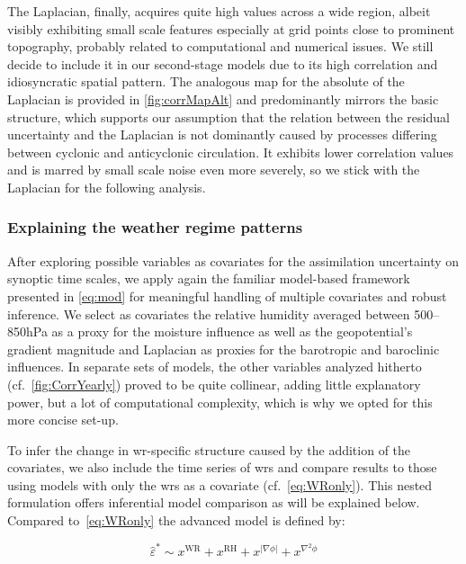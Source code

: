 The Laplacian, finally, acquires quite high values across a wide region, albeit visibly exhibiting small scale features especially at grid points close to prominent topography, probably related to computational and numerical issues. We still decide to include it in our second-stage models due to its high correlation and idiosyncratic spatial pattern. The analogous map for the absolute of the Laplacian is provided in \cref{fig:corrMapAlt} and predominantly mirrors the basic structure, which supports our assumption that the relation between the residual uncertainty and the Laplacian is not dominantly caused by processes differing between cyclonic and anticyclonic circulation. It exhibits lower correlation values and is marred by small scale noise even more severely, so we stick with the Laplacian for the following analysis.

\subsubsection{Explaining the weather regime patterns} \label{sec:EDA_WRAtt}

After exploring possible variables as covariates for the assimilation uncertainty on synoptic time scales, we apply again the familiar model-based framework presented in \cref{eq:mod} for meaningful handling of multiple covariates and robust inference. We select as covariates the relative humidity averaged between 500--850hPa as a proxy for the moisture influence as well as the geopotential's gradient magnitude and Laplacian as proxies for the barotropic and baroclinic influences. In separate sets of models, the other variables analyzed hitherto (cf.~\cref{fig:CorrYearly}) proved to be quite collinear, adding little explanatory power, but a lot of computational complexity, which is why we opted for this more concise set-up.

To infer the change in \gls{wr}-specific structure caused by the addition of the covariates, we also include the time series of \glspl{wr} and compare results to those using models with only the \glspl{wr} as a covariate (cf.~\cref{eq:WRonly}). This nested formulation offers inferential model comparison as will be explained below. Compared to~\eqref{eq:WRonly} the advanced model is defined by:

\begin{equation}\label{eq:fullMod}
    \hat{\varepsilon}^* \sim x^{\mathrm{WR}} + x^{\mathrm{RH}} + x^{|\nabla \phi|} + x^{\nabla^2 \phi}
\end{equation}

